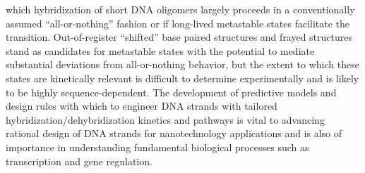 \documentclass[journal=jpcbfk,manuscript=article]{achemso}
\begin{document}
which hybridization of short DNA oligomers largely proceeds in a conventionally assumed ``all-or-nothing'' fashion or if long-lived metastable states facilitate the transition.\citep{Araque2016LatticeCooperativity, Sikora2013ModelingIntermediates, Wyer2014KineticsAT-tracts, Sanstead2016, Sanstead2018DirectDehybridization, Xiao2019} Out-of-register ``shifted'' base paired structures \citep{Phys2014, Maciejczyk2014DNAModel, Araque2016LatticeCooperativity, Xiao2019} and frayed structures \citep{Zgarbova2014BaseRNA, Nonin1995TerminalFraying, Nikolova2012ProbingSimulations, Andreatta2006UltrafastHelix} stand as candidates for metastable states with the potential to mediate substantial deviations from all-or-nothing behavior, but the extent to which these states are kinetically relevant is difficult to determine experimentally and is likely to be highly sequence-dependent. The development of predictive models and design rules with which to engineer DNA strands with tailored hybridization/dehybridization kinetics and pathways is vital to advancing rational design of DNA strands for nanotechnology applications and is also of importance in understanding fundamental biological processes such as transcription and gene regulation.
\end{document}
